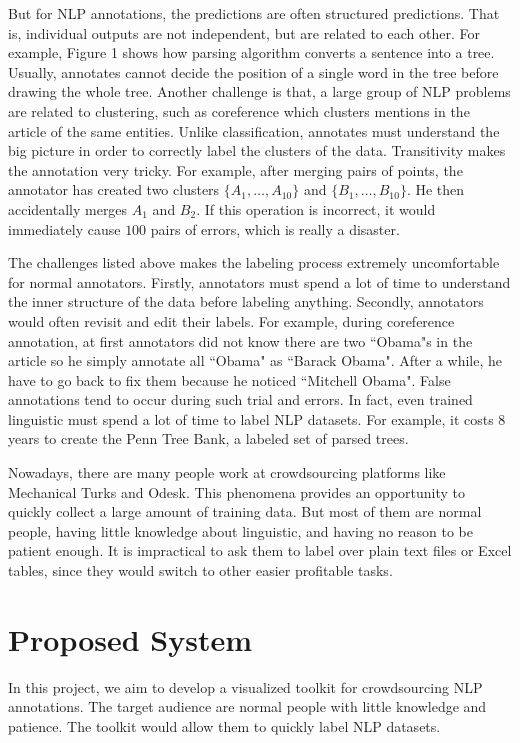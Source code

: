\documentclass[11pt]{article}
\begin{document}
But for NLP annotations, the predictions are often structured predictions. That is, individual outputs are not independent, but are related to each other. For example, Figure 1 shows how parsing algorithm converts a sentence into a tree. Usually, annotates cannot decide the position of a single word in the tree before drawing the whole tree.  Another challenge is that, a large group of NLP problems are related to clustering, such as coreference which clusters mentions in the article of the same entities. Unlike classification, annotates must understand the big picture in order to correctly label the clusters of the data. Transitivity makes the annotation very tricky. For example, after merging pairs of points, the annotator has created two clusters $\{A_1,\ldots,A_{10}\}$ and $\{B_1,\ldots,B_{10}\}$. He then accidentally merges $A_1$ and $B_2$. If this operation is incorrect, it would immediately cause $100$ pairs of errors, which is really a disaster. 


The challenges listed above makes the labeling process extremely uncomfortable for normal annotators. Firstly, annotators must spend a lot of time to understand the inner structure of the data before labeling anything. Secondly, annotators would often revisit and edit their labels. For example, during coreference annotation, at first annotators did not know there are two ``Obama"s in the article so he simply annotate all ``Obama" as ``Barack Obama". After a while, he have to go back to fix them because he noticed ``Mitchell Obama". False annotations tend to occur during such trial and errors. In fact, even trained linguistic must spend a lot of time to label NLP datasets. For example, it costs 8 years to create the Penn Tree Bank, a labeled set of parsed trees. 

Nowadays, there are many people work at crowdsourcing platforms like Mechanical Turks and Odesk. This phenomena provides an opportunity to quickly collect a large amount of training data. But most of them are normal people, having little knowledge about linguistic, and having no reason to be patient enough. It is impractical to ask them to label over plain text files or Excel tables, since they would switch to other easier profitable tasks.


\section{Proposed System}

In this project, we aim to develop a visualized toolkit for crowdsourcing NLP annotations. The target audience are normal people with little knowledge and patience. The toolkit would allow them to quickly label NLP datasets.
\end{document}
